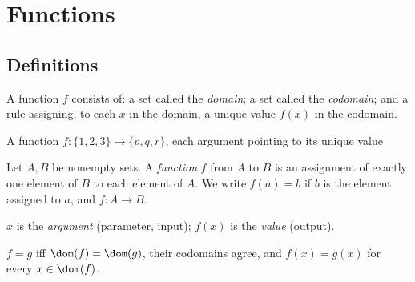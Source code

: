 \newpage
\section{Functions}

\subsection{Definitions}
\label{sec:2-1}
\begin{definition}[Function]
A function $f$ consists of: a set called the \emph{domain}; a set called the \emph{codomain}; and a rule assigning, to each $x$ in the domain, a unique value $f(x)$ in the codomain.
\end{definition}

\begin{center}
\end{center}
\begin{center}
\small A function $f:\{1,2,3\}\to\{p,q,r\}$, each argument pointing to its unique value
\end{center}

\begin{note}
Let $A,B$ be nonempty sets. A \emph{function} $f$ from $A$ to $B$ is an assignment of exactly one element of $B$ to each element of $A$. We write $f(a)=b$ if $b$ is the element assigned to $a$, and $f: A \to B$.
\end{note}

\begin{note}
$x$ is the \emph{argument} (parameter, input); $f(x)$ is the \emph{value} (output).
\end{note}

\begin{definition}
$f = g$ iff $\dom(f) = \dom(g)$, their codomains agree, and $f(x) = g(x)$ for every $x \in \dom(f)$.
\end{definition}

